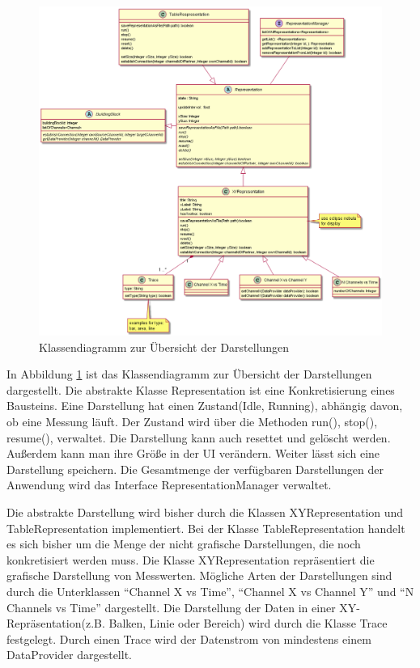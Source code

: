 \documentclass[parskip=full]{scrartcl}
\begin{document}
\begin{figure}[htbp]
	\begin{center}
		\includegraphics[width = 16cm]{Grafik/Representation.png}
		\caption{Klassendiagramm zur Übersicht der Darstellungen}
		\label{class-Representation}
	\end{center}
\end{figure}
In Abbildung \ref{class-Representation} ist das Klassendiagramm zur Übersicht der Darstellungen dargestellt. Die abstrakte Klasse Representation ist eine Konkretisierung eines Bausteins. Eine Darstellung hat einen Zustand(Idle, Running), abhängig davon, ob eine Messung läuft. Der Zustand wird über die Methoden run(), stop(), resume(), verwaltet. Die Darstellung kann auch resettet und gelöscht werden. Außerdem kann man ihre Größe in der UI verändern. Weiter lässt sich eine Darstellung speichern.
Die Gesamtmenge der verfügbaren Darstellungen der Anwendung wird das Interface RepresentationManager verwaltet.

Die abstrakte Darstellung wird bisher durch die Klassen XYRepresentation und TableRepresentation implementiert. Bei der Klasse TableRepresentation handelt es sich bisher um die Menge der nicht grafische Darstellungen, die noch konkretisiert werden muss.
Die Klasse XYRepresentation repräsentiert die grafische Darstellung von Messwerten. Mögliche Arten der Darstellungen sind durch die Unterklassen "`Channel X vs Time"', "`Channel X vs Channel Y"' und "`N Channels vs Time"' dargestellt.
Die Darstellung der Daten in einer XY-Repräsentation(z.B. Balken, Linie oder Bereich) wird durch die Klasse Trace festgelegt. Durch einen Trace wird der Datenstrom von mindestens einem DataProvider dargestellt.
\end{document}

